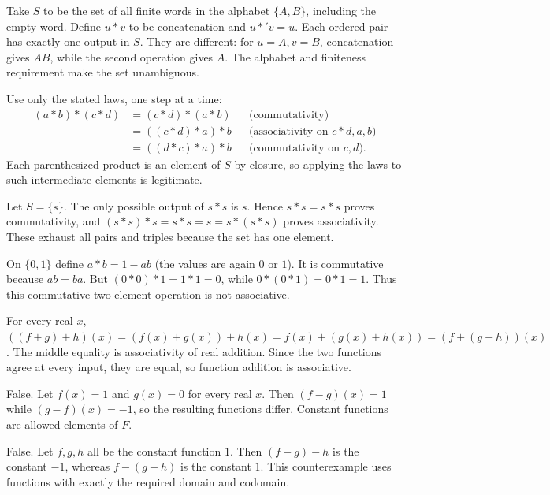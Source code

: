 Take $S$ to be the set of all finite words in the alphabet $\{A,B\}$, including the empty word. Define $u*v$ to be concatenation and $u*'v=u$. Each ordered pair has exactly one output in $S$. They are different: for $u=A,v=B$, concatenation gives $AB$, while the second operation gives $A$. The alphabet and finiteness requirement make the set unambiguous.


Use only the stated laws, one step at a time:
\[\begin{aligned}
(a*b)*(c*d)&=(c*d)*(a*b)&&\text{(commutativity)}\\
&=((c*d)*a)*b&&\text{(associativity on }c*d,a,b)\\
&=((d*c)*a)*b&&\text{(commutativity on }c,d).
\end{aligned}\]
Each parenthesized product is an element of $S$ by closure, so applying the laws to such intermediate elements is legitimate.


Let $S=\{s\}$. The only possible output of $s*s$ is $s$. Hence $s*s=s*s$ proves commutativity, and $(s*s)*s=s*s=s=s*(s*s)$ proves associativity. These exhaust all pairs and triples because the set has one element.


On $\{0,1\}$ define $a*b=1-ab$ (the values are again $0$ or $1$). It is commutative because $ab=ba$. But $(0*0)*1=1*1=0$, while $0*(0*1)=0*1=1$. Thus this commutative two-element operation is not associative.


For every real $x$, $((f+g)+h)(x)=(f(x)+g(x))+h(x)=f(x)+(g(x)+h(x))=(f+(g+h))(x)$. The middle equality is associativity of real addition. Since the two functions agree at every input, they are equal, so function addition is associative.


False. Let $f(x)=1$ and $g(x)=0$ for every real $x$. Then $(f-g)(x)=1$ while $(g-f)(x)=-1$, so the resulting functions differ. Constant functions are allowed elements of $F$.


False. Let $f,g,h$ all be the constant function $1$. Then $(f-g)-h$ is the constant $-1$, whereas $f-(g-h)$ is the constant $1$. This counterexample uses functions with exactly the required domain and codomain.

